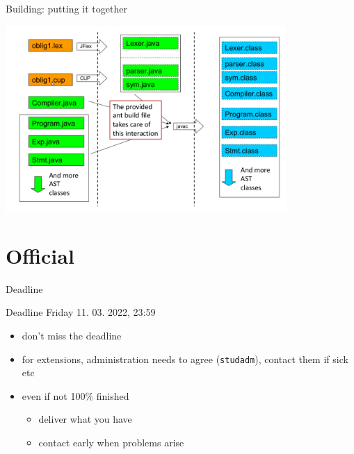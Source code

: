 \documentclass{beamer}
\begin{document}
\begin{frame}[label={sec:orgfe44dff}]{Building: putting it together}

\begin{center}
 \includegraphics[width=0.8\textwidth]{figures/snaps/buildprocess}
\end{center}
\end{frame}

\section{Official}
\label{sec:orgca01569}

\begin{frame}[label={sec:org1ea5562},fragile]{Deadline}
 \begin{alertblock}{Deadline}
\alert{Friday 11. 03. 2022, 23:59}
\end{alertblock}


\begin{itemize}
\item don't miss the deadline
\item for extensions, administration needs to agree (\texttt{studadm}), contact them
if sick etc
\item even if not 100\% finished
\begin{itemize}
\item deliver what you have
\item contact early when problems arise
\end{itemize}
\end{itemize}
\end{frame}
\end{document}
